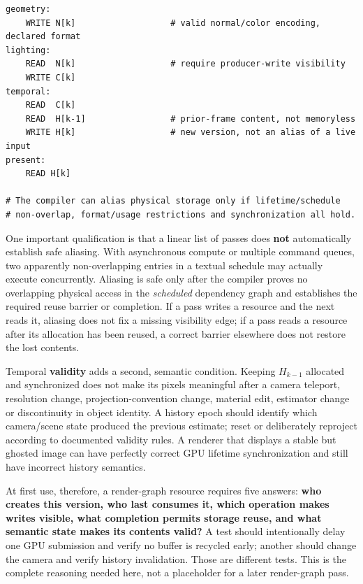 \begin{verbatim}
geometry:
    WRITE N[k]                   # valid normal/color encoding, declared format
lighting:
    READ  N[k]                   # require producer-write visibility
    WRITE C[k]
temporal:
    READ  C[k]
    READ  H[k-1]                 # prior-frame content, not memoryless
    WRITE H[k]                   # new version, not an alias of a live input
present:
    READ H[k]

# The compiler can alias physical storage only if lifetime/schedule
# non-overlap, format/usage restrictions and synchronization all hold.
\end{verbatim}

One important qualification is that a linear list of passes does \textbf{not} automatically establish safe aliasing. With asynchronous compute or multiple command queues, two apparently non-overlapping entries in a textual schedule may actually execute concurrently. Aliasing is safe only after the compiler proves no overlapping physical access in the \emph{scheduled} dependency graph and establishes the required reuse barrier or completion. If a pass writes a resource and the next reads it, aliasing does not fix a missing visibility edge; if a pass reads a resource after its allocation has been reused, a correct barrier elsewhere does not restore the lost contents.

Temporal \textbf{validity} adds a second, semantic condition. Keeping \(H_{k-1}\) allocated and synchronized does not make its pixels meaningful after a camera teleport, resolution change, projection-convention change, material edit, estimator change or discontinuity in object identity. A history epoch should identify which camera/scene state produced the previous estimate; reset or deliberately reproject according to documented validity rules. A renderer that displays a stable but ghosted image can have perfectly correct GPU lifetime synchronization and still have incorrect history semantics.

At first use, therefore, a render-graph resource requires five answers: \textbf{who creates this version, who last consumes it, which operation makes writes visible, what completion permits storage reuse, and what semantic state makes its contents valid?} A test should intentionally delay one GPU submission and verify no buffer is recycled early; another should change the camera and verify history invalidation. Those are different tests. This is the complete reasoning needed here, not a placeholder for a later render-graph pass.

